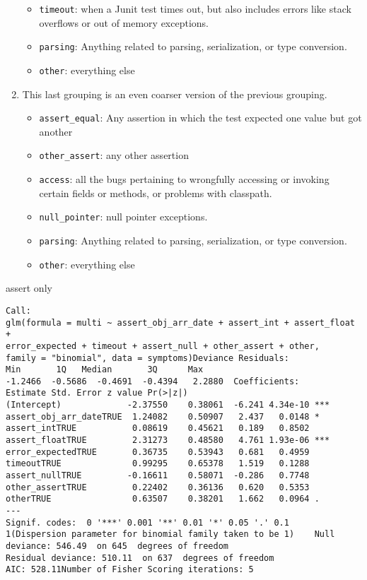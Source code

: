 \begin{enumerate}
\begin{itemize}
		\item \lstinline{timeout}: when a Junit test times out, but also includes errors like stack overflows or out of memory exceptions.
		\item \lstinline{parsing}: Anything related to parsing, serialization, or type conversion.
		\item \lstinline{other}: everything else
	\end{itemize}
	\item This last grouping is an even coarser version of the previous grouping.
	\begin{itemize}
		\item \lstinline{assert_equal}: Any assertion in which the test expected one value but got another
		\item \lstinline{other_assert}: any other assertion
		\item \lstinline{access}: all the bugs pertaining to wrongfully accessing or invoking certain fields or methods, or problems with classpath.
		\item \lstinline{null_pointer}: null pointer exceptions.
		\item \lstinline{parsing}: Anything related to parsing, serialization, or type conversion.
		\item \lstinline{other}: everything else
	\end{itemize}
\end{enumerate}


assert only
\begin{lstlisting}
Call:
glm(formula = multi ~ assert_obj_arr_date + assert_int + assert_float +
error_expected + timeout + assert_null + other_assert + other,
family = "binomial", data = symptoms)Deviance Residuals:
Min       1Q   Median       3Q      Max
-1.2466  -0.5686  -0.4691  -0.4394   2.2880  Coefficients:
Estimate Std. Error z value Pr(>|z|)
(Intercept)             -2.37550    0.38061  -6.241 4.34e-10 ***
assert_obj_arr_dateTRUE  1.24082    0.50907   2.437   0.0148 *
assert_intTRUE           0.08619    0.45621   0.189   0.8502
assert_floatTRUE         2.31273    0.48580   4.761 1.93e-06 ***
error_expectedTRUE       0.36735    0.53943   0.681   0.4959
timeoutTRUE              0.99295    0.65378   1.519   0.1288
assert_nullTRUE         -0.16611    0.58071  -0.286   0.7748
other_assertTRUE         0.22402    0.36136   0.620   0.5353
otherTRUE                0.63507    0.38201   1.662   0.0964 .
---
Signif. codes:  0 '***' 0.001 '**' 0.01 '*' 0.05 '.' 0.1   1(Dispersion parameter for binomial family taken to be 1)    Null deviance: 546.49  on 645  degrees of freedom
Residual deviance: 510.11  on 637  degrees of freedom
AIC: 528.11Number of Fisher Scoring iterations: 5
\end{lstlisting}

